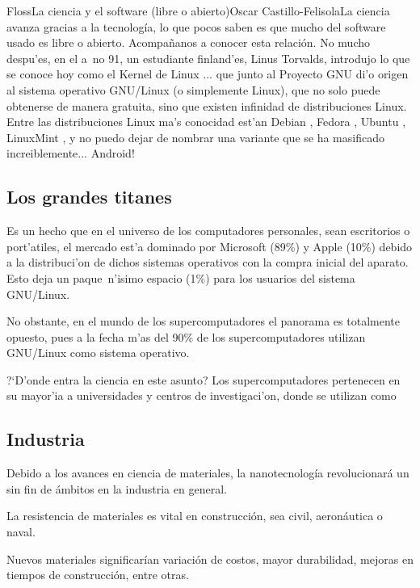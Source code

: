 \begin{article}[2]{Floss}{La ciencia y el software (libre o abierto)}{Oscar Castillo-Felisola}{La ciencia avanza gracias a la tecnolog\'ia, lo que pocos saben es que mucho del software usado es libre o abierto. Acompa\~nanos a conocer esta relaci\'on.}
No mucho despu'es, en el  a~no 91, un estudiante finland'es, Linus Torvalds, introdujo lo que se conoce hoy como el Kernel de Linux ... que junto al Proyecto GNU di'o origen al sistema operativo GNU/Linux (o simplemente Linux), que no solo puede obtenerse de manera gratuita, sino que existen infinidad de distribuciones Linux. Entre las distribuciones Linux ma's conocidad est'an Debian , Fedora , Ubuntu , LinuxMint , y no puedo dejar de nombrar una variante que se ha masificado increiblemente... Android! 

\subsection{Los grandes titanes}


Es un hecho que en el universo de los computadores personales, sean escritorios o port'atiles, el mercado est'a dominado por Microsoft (89\%) y Apple (10\%) debido a la distribuci'on de dichos sistemas operativos con la compra inicial del aparato. Esto deja un paque~n'isimo espacio (1\%) para los usuarios del sistema GNU/Linux.

No obstante, en el mundo de los supercomputadores el panorama es totalmente opuesto, pues a la fecha m'as del 90\% de los supercomputadores utilizan GNU/Linux como sistema operativo.

?`D'onde entra la ciencia en este asunto? Los supercomputadores pertenecen en su mayor'ia a universidades y centros de investigaci'on, donde se utilizan como 

\subsection{Industria}

Debido a los avances en ciencia de materiales, la nanotecnolog\'ia revolucionar\'a un sin fin de \'ambitos en la industria en general.

La resistencia de materiales es vital en construcci\'on, sea civil, aeron\'autica o naval. 

Nuevos materiales significar\'ian variaci\'on de costos, mayor durabilidad, mejoras en tiempos de construcci\'on, entre otras.


\end{article}

